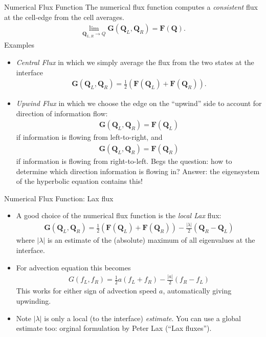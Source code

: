\documentclass[aspectratio=169]{beamer}
\newcommand{\mypause}{\pause}
\newcommand{\mvec}[1]{\mathbf{#1}}
\begin{document}
\begin{frame}{Numerical Flux Function}
  \footnotesize%
  The numerical flux function computes a \emph{consistent} flux at the
  cell-edge from the cell averages.
  \begin{align*}
    \lim_{\mvec{Q}_{L,R}\rightarrow Q} \mvec{G}(\mvec{Q}_L,\mvec{Q}_R) = \mvec{F}(\mvec{Q}).
  \end{align*}
  Examples
  \begin{itemize}
  \item \emph{Central Flux} in which we simply average the flux from
    the two states at the interface
    \begin{align*}
      \mvec{G}(\mvec{Q}_L,\mvec{Q}_R) = \frac{1}{2}
      \left( \mvec{F}(\mvec{Q}_L) + \mvec{F}(\mvec{Q}_R) \right) .
    \end{align*}
  \item \emph{Upwind Flux} in which we choose the edge on the
    ``upwind'' side to account for direction of information flow:
    \begin{align*}
      \mvec{G}(\mvec{Q}_L,\mvec{Q}_R) = \mvec{F}(\mvec{Q}_L)
    \end{align*}
    if information is flowing from left-to-right, and
    \begin{align*}
      \mvec{G}(\mvec{Q}_L,\mvec{Q}_R) = \mvec{F}(\mvec{Q}_R)
    \end{align*}
    if information is flowing from right-to-left. Begs the question:
    how to determine which direction information is flowing in?
    Answer: the eigensystem of the hyperbolic equation contains this!
  \end{itemize} 
\end{frame}

\begin{frame}{Numerical Flux Function: Lax flux}
  \small%
  \begin{itemize}
  \item A good choice of the numerical flux function is the
    \emph{local Lax} flux:
    \begin{align*}
      \mvec{G}(\mvec{Q}_L,\mvec{Q}_R) = \frac{1}{2}
      \left( \mvec{F}(\mvec{Q}_L) + \mvec{F}(\mvec{Q}_R) \right)
      - \frac{|\lambda|}{2}( \mvec{Q}_R - \mvec{Q}_L )
    \end{align*}
    where $|\lambda|$ is an estimate of the (absolute) maximum of all
    eigenvalues at the interface.%
    \mypause%
  \item   For advection equation this becomes
    \begin{align*}
      G(f_L,f_R) = \frac{1}{2} a ( f_L + f_R ) - \frac{|a|}{2}( f_R - f_L )
    \end{align*}
    This works for either sign of advection speed $a$, automatically
    giving upwinding.%
    \mypause%
  \item Note $|\lambda|$ is only a local (to the interface)
    \emph{estimate}. You can use a global estimate too: orginal
    formulation by Peter Lax (``Lax fluxes'').
  \end{itemize}

\end{frame}
\end{document}
